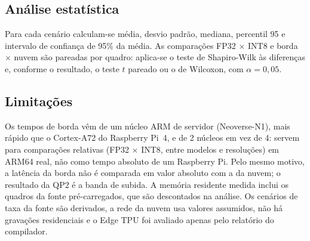 \subsection{Análise estatística}
Para cada cenário calculam-se média, desvio padrão, mediana, percentil 95 e intervalo de confiança de
95\% da média. As comparações FP32 $\times$ INT8 e borda $\times$ nuvem são pareadas por quadro: aplica-se
o teste de Shapiro-Wilk às diferenças e, conforme o resultado, o teste $t$ pareado ou o de Wilcoxon,
com $\alpha = 0{,}05$.

\subsection{Limitações}
Os tempos de borda vêm de um núcleo ARM de servidor (Neoverse-N1), mais rápido que o Cortex-A72 do
Raspberry Pi~4, e de 2 núcleos em vez de 4: servem para comparações relativas (FP32 $\times$ INT8, entre
modelos e resoluções) em ARM64 real, não como tempo absoluto de um Raspberry Pi. Pelo mesmo motivo, a
latência da borda não é comparada em valor absoluto com a da nuvem; o resultado da QP2 é a banda de
subida. A memória residente medida inclui os quadros da fonte pré-carregados, que são descontados na
análise. Os cenários de taxa da fonte são derivados, a rede da nuvem usa valores assumidos, não há
gravações residenciais e o Edge TPU foi avaliado apenas pelo relatório do compilador.
